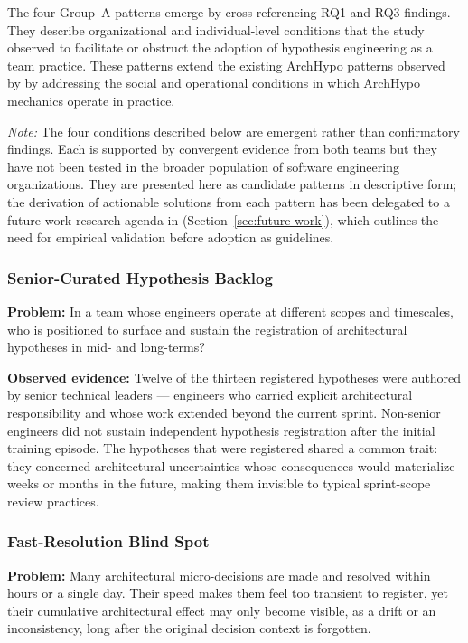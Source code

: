The four Group~A patterns emerge by cross-referencing RQ1 and RQ3 findings. They
describe organizational and individual-level conditions that the study observed
to facilitate or obstruct the adoption of hypothesis engineering as a team
practice. These patterns extend the existing ArchHypo patterns observed by
\citet{silva2024patterns, silva2023initialpatterns} by addressing the social and
operational conditions in which ArchHypo mechanics operate in practice.

\emph{Note:} The four conditions described below are emergent rather than
confirmatory findings. Each is supported by convergent evidence from both
teams but they have not been tested in the broader population of software engineering
organizations. They are presented here as candidate patterns in descriptive
form; the derivation of actionable solutions from each pattern has been delegated to
a future-work research agenda in (Section~\ref{sec:future-work}), which outlines
the need for empirical validation before adoption as guidelines.

\subsubsection{Senior-Curated Hypothesis Backlog}
\label{subsubsec:pattern-a1}

\textbf{Problem:} In a team whose engineers operate at different scopes and
timescales, who is positioned to surface and sustain the registration of 
architectural hypotheses in mid- and long-terms?

\textbf{Observed evidence:} Twelve of the thirteen registered hypotheses were
authored by senior technical leaders — engineers who carried explicit
architectural responsibility and whose work extended beyond the current
sprint. Non-senior engineers did not sustain independent hypothesis registration
after the initial training episode. The hypotheses that were registered shared
a common trait: they concerned architectural uncertainties whose consequences would materialize
weeks or months in the future, making them invisible to typical sprint-scope
review practices.

\subsubsection{Fast-Resolution Blind Spot}
\label{subsubsec:pattern-a2}

\textbf{Problem:} Many architectural micro-decisions are made and resolved within
hours or a single day. Their speed makes them feel too transient to register, yet
their cumulative architectural effect may only become visible, as a drift or an
inconsistency, long after the original decision context is forgotten.

